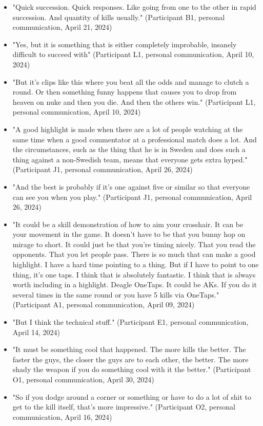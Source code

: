 \begin{itemize}
    \item "Quick succession. Quick responses. Like going from one to the other in rapid succession. And quantity of kills usually." (Participant B1, personal communication, April 21, 2024)
    \item "Yes, but it is something that is either completely improbable, insanely difficult to succeed with" (Participant L1, personal communication, April 10, 2024)
    \item "But it's clips like this where you beat all the odds and manage to clutch a round. Or then something funny happens that causes you to drop from heaven on nuke and then you die. And then the others win." (Participant L1, personal communication, April 10, 2024)
    \item "A good highlight is made when there are a lot of people watching at the same time when a good commentator at a professional match does a lot. And the circumstances, such as the thing that he is in Sweden and does such a thing against a non-Swedish team, means that everyone gets extra hyped." (Participant J1, personal communication, April 26, 2024)
    \item "And the best is probably if it's one against five or similar so that everyone can see you when you play." (Participant J1, personal communication, April 26, 2024)
    \item "It could be a skill demonstration of how to aim your crosshair. It can be your movement in the game. It doesn't have to be that you bunny hop on mirage to short. It could just be that you're timing nicely. That you read the opponents. That you let people pass. There is so much that can make a good highlight. I have a hard time pointing to a thing. But if I have to point to one thing, it's one taps. I think that is absolutely fantastic. I think that is always worth including in a highlight. Deagle OneTaps. It could be AKs. If you do it several times in the same round or you have 5 kills via OneTaps." (Participant A1, personal communication, April 09, 2024)
    \item "But I think the technical stuff." (Participant E1, personal communication, April 14, 2024)
    \item "It must be something cool that happened. The more kills the better. The faster the guys, the closer the guys are to each other, the better. The more shady the weapon if you do something cool with it the better." (Participant O1, personal communication, April 30, 2024)
    \item "So if you dodge around a corner or something or have to do a lot of shit to get to the kill itself, that's more impressive." (Participant O2, personal communication, April 16, 2024)
\end{itemize}

